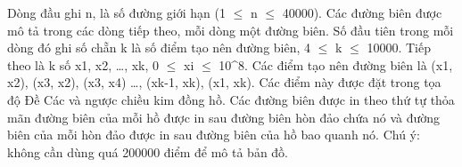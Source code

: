 Dòng đầu ghi n, là số đường giới hạn (1  $\le$  n  $\le$  40000).  Các đường biên được mô tả trong các dòng tiếp theo, mỗi dòng một đường biên. Số đầu tiên trong mỗi dòng đó ghi số chẵn k là số điểm tạo nên đường biên, 4  $\le$  k  $\le$  10000. Tiếp theo là k số x1, x2, …, xk, 0  $\le$  xi  $\le$  10^8. Các điểm tạo nên đường biên là (x1, x2), (x3, x2), (x3, x4) …, (xk-1, xk), (x1, xk). Các điểm này được đặt trong tọa độ Đề Các và ngược chiều kim đồng hồ. Các đường biên được in theo thứ tự thỏa mãn đường biên của mỗi hồ được in sau đường biên hòn đảo chứa nó và đường biên của mỗi hòn đảo được in sau đường biên của hồ bao quanh nó. Chú ý: không cần dùng quá 200000 điểm để mô tả bản đồ.  

\